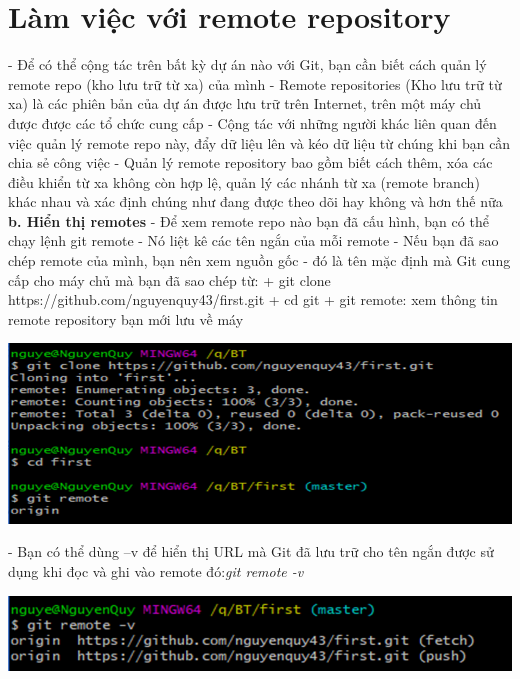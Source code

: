 \documentclass[12pt,a4paper]{report}
\begin{document}
\section{Làm việc với remote repository}
\hspace{0.6cm}{\bf a. Tổng quan} \vskip 0.4cm
- Để có thể cộng tác trên bất kỳ dự án nào với Git, bạn cần biết cách quản lý remote repo (kho lưu trữ từ xa) của mình\vskip 0.4cm
- Remote repositories (Kho lưu trữ từ xa) là các phiên bản của dự án được lưu trữ trên Internet,  trên một máy chủ được được các tổ chức cung cấp\vskip 0.4cm
- Cộng tác với những người khác liên quan đến việc quản lý remote repo này, đẩy dữ liệu lên và kéo dữ liệu  từ chúng khi bạn cần chia sẻ công việc\vskip 0.4cm
- Quản lý remote repository bao gồm biết cách thêm, xóa các điều khiển từ xa không còn hợp lệ, quản lý các nhánh từ xa (remote branch) khác nhau và xác định chúng như đang được theo dõi hay không và hơn thế nữa\vskip 0.4cm
{\bf b. Hiển thị remotes} \vskip 0.4cm
- Để xem remote repo nào bạn đã cấu hình, bạn có thể chạy lệnh git remote\vskip 0.4cm
- Nó liệt kê các tên ngắn của mỗi remote\vskip 0.4cm
- Nếu bạn đã sao chép remote của mình, bạn nên xem nguồn gốc - đó là tên mặc định mà Git cung cấp cho máy chủ mà bạn đã sao chép từ:\vskip 0.4cm
+ git clone https://github.com/nguyenquy43/first.git\vskip 0.4cm
+ cd git\vskip 0.4cm
+ git remote: xem thông tin remote repository bạn mới lưu về máy\vskip 0.4cm

	\includegraphics[width=0.8\linewidth]{screenshot032}
	
	\label{fig:screenshot032}
\vskip 0.4cm\vskip 0.4cm
- Bạn có thể dùng –v để hiển thị URL mà Git đã lưu trữ cho tên ngắn được sử dụng khi đọc và ghi vào remote đó:{\it git remote -v}\vskip 0.4cm

	\includegraphics[width=0.8\linewidth]{screenshot033}
	
\end{document}
